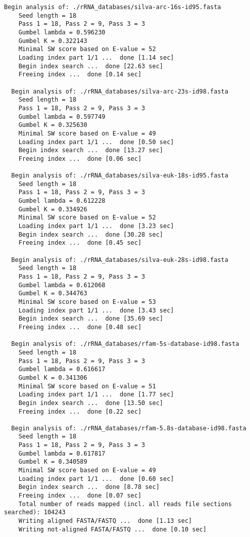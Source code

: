 \documentclass[10pt,a4paper]{article}
\begin{document}
\begin{Verbatim}[fontsize=\footnotesize]
  Begin analysis of: ./rRNA_databases/silva-arc-16s-id95.fasta
    Seed length = 18
    Pass 1 = 18, Pass 2 = 9, Pass 3 = 3
    Gumbel lambda = 0.596230
    Gumbel K = 0.322143
    Minimal SW score based on E-value = 52
    Loading index part 1/1 ...  done [1.14 sec]
    Begin index search ...  done [22.63 sec]
    Freeing index ...  done [0.14 sec]

  Begin analysis of: ./rRNA_databases/silva-arc-23s-id98.fasta
    Seed length = 18
    Pass 1 = 18, Pass 2 = 9, Pass 3 = 3
    Gumbel lambda = 0.597749
    Gumbel K = 0.325630
    Minimal SW score based on E-value = 49
    Loading index part 1/1 ...  done [0.50 sec]
    Begin index search ...  done [13.27 sec]
    Freeing index ...  done [0.06 sec]

  Begin analysis of: ./rRNA_databases/silva-euk-18s-id95.fasta
    Seed length = 18
    Pass 1 = 18, Pass 2 = 9, Pass 3 = 3
    Gumbel lambda = 0.612228
    Gumbel K = 0.334926
    Minimal SW score based on E-value = 52
    Loading index part 1/1 ...  done [3.23 sec]
    Begin index search ...  done [30.28 sec]
    Freeing index ...  done [0.45 sec]

  Begin analysis of: ./rRNA_databases/silva-euk-28s-id98.fasta
    Seed length = 18
    Pass 1 = 18, Pass 2 = 9, Pass 3 = 3
    Gumbel lambda = 0.612068
    Gumbel K = 0.344763
    Minimal SW score based on E-value = 53
    Loading index part 1/1 ...  done [3.43 sec]
    Begin index search ...  done [35.69 sec]
    Freeing index ...  done [0.48 sec]

  Begin analysis of: ./rRNA_databases/rfam-5s-database-id98.fasta
    Seed length = 18
    Pass 1 = 18, Pass 2 = 9, Pass 3 = 3
    Gumbel lambda = 0.616617
    Gumbel K = 0.341306
    Minimal SW score based on E-value = 51
    Loading index part 1/1 ...  done [1.77 sec]
    Begin index search ...  done [13.50 sec]
    Freeing index ...  done [0.22 sec]

  Begin analysis of: ./rRNA_databases/rfam-5.8s-database-id98.fasta
    Seed length = 18
    Pass 1 = 18, Pass 2 = 9, Pass 3 = 3
    Gumbel lambda = 0.617817
    Gumbel K = 0.340589
    Minimal SW score based on E-value = 49
    Loading index part 1/1 ...  done [0.60 sec]
    Begin index search ...  done [8.78 sec]
    Freeing index ...  done [0.07 sec]
    Total number of reads mapped (incl. all reads file sections searched): 104243
    Writing aligned FASTA/FASTQ ...  done [1.13 sec]
    Writing not-aligned FASTA/FASTQ ...  done [0.10 sec]
              
\end{Verbatim}
\end{document}
